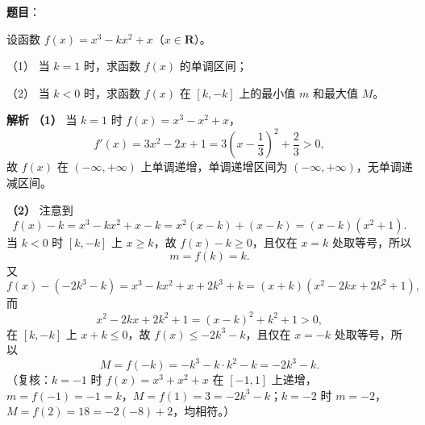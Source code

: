 \begin{answer}

\textbf{题目}：

设函数 $f(x)=x^3-kx^2+x$（$x\in\mathbf R$）。

（1） 当 $k=1$ 时，求函数 $f(x)$ 的单调区间；

（2） 当 $k<0$ 时，求函数 $f(x)$ 在 $[k,-k]$ 上的最小值 $m$ 和最大值 $M$。

\textbf{解析}
\textbf{（1）} 当 $k=1$ 时 $f(x)=x^3-x^2+x$，
\nopagebreak[4]
\[f'(x)=3x^2-2x+1=3\left(x-\frac13\right)^2+\frac23>0,\]
故 $f(x)$ 在 $(-\infty,+\infty)$ 上单调递增，单调递增区间为 $(-\infty,+\infty)$，无单调递减区间。

\textbf{（2）} 注意到
\nopagebreak[4]
\[f(x)-k=x^3-kx^2+x-k=x^2(x-k)+(x-k)=(x-k)(x^2+1).\]
当 $k<0$ 时 $[k,-k]$ 上 $x\geqslant k$，故 $f(x)-k\geqslant0$，且仅在 $x=k$ 处取等号，所以
\nopagebreak[4]
\[m=f(k)=k.\]
又
\nopagebreak[4]
\[f(x)-(-2k^3-k)=x^3-kx^2+x+2k^3+k=(x+k)\left(x^2-2kx+2k^2+1\right),\]
而
\nopagebreak[4]
\[x^2-2kx+2k^2+1=(x-k)^2+k^2+1>0,\]
在 $[k,-k]$ 上 $x+k\leqslant0$，故 $f(x)\leqslant-2k^3-k$，且仅在 $x=-k$ 处取等号，所以
\nopagebreak[4]
\[M=f(-k)=-k^3-k\cdot k^2-k=-2k^3-k.\]
（复核：$k=-1$ 时 $f(x)=x^3+x^2+x$ 在 $[-1,1]$ 上递增，$m=f(-1)=-1=k$，$M=f(1)=3=-2k^3-k$；$k=-2$ 时 $m=-2$，$M=f(2)=18=-2(-8)+2$，均相符。）



\end{answer}